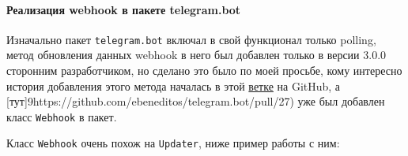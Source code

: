 \documentclass[
]{book}
\newenvironment{Shaded}{\begin{snugshade}}{\end{snugshade}}
\newcommand{\AttributeTok}[1]{\textcolor[rgb]{0.13,0.29,0.53}{#1}}
\newcommand{\CommentTok}[1]{\textcolor[rgb]{0.56,0.35,0.01}{\textit{#1}}}
\newcommand{\ConstantTok}[1]{\textcolor[rgb]{0.56,0.35,0.01}{#1}}
\newcommand{\ControlFlowTok}[1]{\textcolor[rgb]{0.13,0.29,0.53}{\textbf{#1}}}
\newcommand{\DecValTok}[1]{\textcolor[rgb]{0.00,0.00,0.81}{#1}}
\newcommand{\FunctionTok}[1]{\textcolor[rgb]{0.13,0.29,0.53}{\textbf{#1}}}
\newcommand{\NormalTok}[1]{#1}
\newcommand{\OtherTok}[1]{\textcolor[rgb]{0.56,0.35,0.01}{#1}}
\newcommand{\SpecialCharTok}[1]{\textcolor[rgb]{0.81,0.36,0.00}{\textbf{#1}}}
\newcommand{\StringTok}[1]{\textcolor[rgb]{0.31,0.60,0.02}{#1}}
\begin{document}
\paragraph{Реализация webhook в пакете telegram.bot}\label{ux440ux435ux430ux43bux438ux437ux430ux446ux438ux44f-webhook-ux432-ux43fux430ux43aux435ux442ux435-telegram.bot}

Изначально пакет \texttt{telegram.bot} включал в свой функционал только polling, метод обновления данных webhook в него был добавлен только в версии 3.0.0 сторонним разработчиком, но сделано это было по моей просьбе, кому интересно история добавления этого метода началась в этой \href{https://github.com/virtualstaticvoid/heroku-buildpack-r/issues/162}{ветке} на GitHub, а {[}тут{]}9https://github.com/ebeneditos/telegram.bot/pull/27) уже был добавлен класс \texttt{Webhook} в пакет.

Класс \texttt{Webhook} очень похож на \texttt{Updater}, ниже пример работы с ним:

\begin{Shaded}
\end{Shaded}
\end{document}
